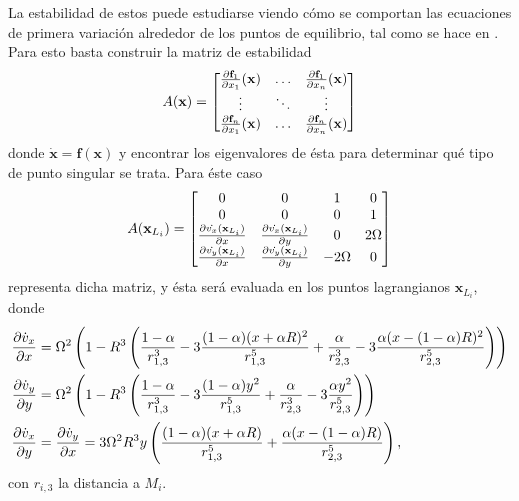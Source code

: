 
La estabilidad de estos puede estudiarse viendo cómo se comportan las ecuaciones de primera variación alrededor de los puntos de equilibrio, tal como se hace en \cite{WMAP}. Para esto basta construir la matriz de estabilidad 
\begin{equation*}
 A(\mathbf{x}) = \begin{bmatrix}
  \frac{\partial \mathbf{f}_1}{\partial x_1}(\mathbf{x}) & \dots & \frac{\partial \mathbf{f}_1}{\partial x_n}(\mathbf{x}) \\
  \vdots & \ddots & \vdots \\ 
  \frac{\partial \mathbf{f}_n}{\partial x_1}(\mathbf{x}) & \dots & \frac{\partial \mathbf{f}_n}{\partial x_n} (\mathbf{x})
\end{bmatrix}
\end{equation*}
donde $\dot{\mathbf{x}} = \mathbf{f}(\mathbf{x})$ y encontrar los eigenvalores de ésta para determinar qué tipo de punto singular se trata. Para éste caso
\begin{equation}
 A(\mathbf{x}_{L_i}) = \begin{bmatrix}
  0 & 0 & 1 & 0 \\
  0 & 0 & 0 & 1 \\ 
  \frac{\partial \dot{v_x}(\mathbf{x}_{L_i})}{\partial x} & \frac{\partial \dot{v_x}(\mathbf{x}_{L_i})}{\partial y} & 0 & 2 \Omega \\
  \frac{\partial \dot{v_y}(\mathbf{x}_{L_i})}{\partial x} & \frac{\partial \dot{v_y}(\mathbf{x}_{L_i})}{\partial y} & -2\Omega & 0
\end{bmatrix}
\end{equation}
representa dicha matriz, y ésta será evaluada en los puntos lagrangianos $\mathbf{x}_{L_i}$, donde 
\begin{align}
 \frac{\partial \dot{v}_x}{\partial x} &= \Omega^2 \left( 1 - R^3 \left( \frac{1-\alpha}{r_{1,3}^3} - 3\frac{(1-\alpha)(x + \alpha R)^2}{r_{1,3}^5} + \frac{\alpha}{r_{2,3}^3} - 3\frac{\alpha(x - (1-\alpha) R)^2}{r_{2,3}^5} \right) \right) \nonumber \\ 
 \frac{\partial \dot{v}_y}{\partial y} &= \Omega^2 \left( 1 - R^3 \left( \frac{1-\alpha}{r_{1,3}^3} - 3\frac{(1-\alpha)y^2}{r_{1,3}^5} + \frac{\alpha}{r_{2,3}^3} - 3\frac{\alpha y^2}{r_{2,3}^5} \right) \right) \nonumber \\
 \frac{\partial \dot{v}_x}{\partial y} &= \frac{\partial \dot{v}_y}{\partial x} = 3 \Omega^2 R^3 y \left( \frac{(1-\alpha )(x+\alpha R)}{r_{1,3}^5} + \frac{\alpha (x- (1-\alpha )R)}{r_{2,3}^5} \right),
 \label{eq:3body_stability}
\end{align}
con $r_{i,3}$ la distancia a $M_i$.

